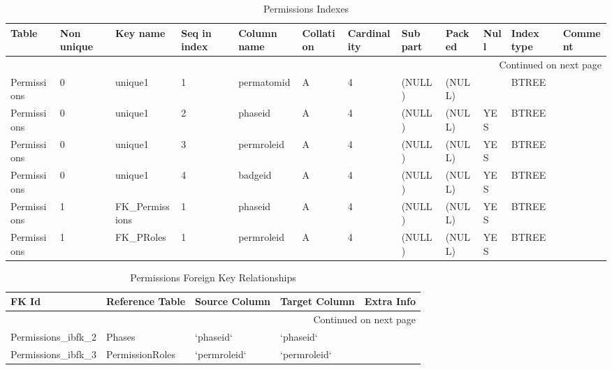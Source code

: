 \documentclass[tablesignature,landscape]{scrartcl}
\begin{document}
\begin{longtable}{|l|l|l|l|l|l|l|l|l|l|l|l|}
\caption{Permissions Indexes} \label{tbl:permissionsindexes}\\
\hline
 Table        &  Non unique  &  Key name           &  Seq in index  &  Column name   &  Collation  &  Cardinality  &  Sub part  &  Packed  &  Null  &  Index type  &  Comment \\
\hline
\endhead
\hline\multicolumn{12}{r}{Continued on next page}\
\endfoot
\endlastfoot
\hline
 Permissions  &           0  &  PRIMARY            &             1  &  permissionid  &  A          &            4  &  (NULL)    &  (NULL)  &        &  BTREE       &           \\
 Permissions  &           0  &  unique1            &             1  &  permatomid    &  A          &            4  &  (NULL)    &  (NULL)  &        &  BTREE       &           \\
 Permissions  &           0  &  unique1            &             2  &  phaseid       &  A          &            4  &  (NULL)    &  (NULL)  &  YES   &  BTREE       &           \\
 Permissions  &           0  &  unique1            &             3  &  permroleid    &  A          &            4  &  (NULL)    &  (NULL)  &  YES   &  BTREE       &           \\
 Permissions  &           0  &  unique1            &             4  &  badgeid       &  A          &            4  &  (NULL)    &  (NULL)  &  YES   &  BTREE       &           \\
 Permissions  &           1  &  FK\_{}Permissions  &             1  &  phaseid       &  A          &            4  &  (NULL)    &  (NULL)  &  YES   &  BTREE       &           \\
 Permissions  &           1  &  FK\_{}PRoles       &             1  &  permroleid    &  A          &            4  &  (NULL)    &  (NULL)  &  YES   &  BTREE       &           \\
\hline
\end{longtable}


\begin{longtable}{|l|l|l|l|l|}
\caption{Permissions Foreign Key Relationships} \label{tbl:permissionsfkr}\\
\hline
 FK Id                     &  Reference Table  &  Source Column  &  Target Column  &  Extra Info \\
\hline
\endhead
\hline\multicolumn{5}{r}{Continued on next page}\
\endfoot
\endlastfoot
\hline
 Permissions\_{}ibfk\_{}1  &  PermissionAtoms  &  `permatomid`   &  `permatomid`   &              \\
 Permissions\_{}ibfk\_{}2  &  Phases           &  `phaseid`      &  `phaseid`      &              \\
 Permissions\_{}ibfk\_{}3  &  PermissionRoles  &  `permroleid`   &  `permroleid`   &              \\
\hline
\end{longtable}
\end{document}
